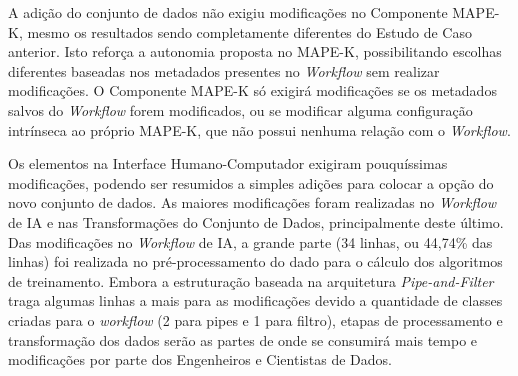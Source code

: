 \documentclass[twocolumn]{article}
\begin{document}
\begin{table}[H]
\begin{center}
  \caption{Quantidade de modificações realizadas ao adicionar um novo conjunto de dados ao \textit{Workflow}}
\label{tbl:ManutencaoPipelineDataset}
\end{center}
\end{table}

A adição do conjunto de dados não exigiu modificações no Componente MAPE-K, mesmo os resultados sendo completamente diferentes do Estudo de Caso anterior. Isto reforça a autonomia proposta no MAPE-K, possibilitando escolhas diferentes baseadas nos metadados presentes no \textit{Workflow} sem realizar modificações. O Componente MAPE-K só exigirá modificações se os metadados salvos do \textit{Workflow} forem modificados, ou se modificar alguma configuração intrínseca ao próprio MAPE-K, que não possui nenhuma relação com o \textit{Workflow}. 

Os elementos na Interface Humano-Computador exigiram pouquíssimas modificações, podendo ser resumidos a simples adições para colocar a opção do novo conjunto de dados. As maiores modificações foram realizadas no \textit{Workflow} de IA e nas Transformações do Conjunto de Dados, principalmente deste último. Das modificações no \textit{Workflow} de IA, a grande parte (34 linhas, ou 44,74\% das linhas) foi realizada no pré-processamento do dado para o cálculo dos algoritmos de treinamento. Embora a estruturação baseada na arquitetura \textit{Pipe-and-Filter} traga algumas linhas a mais para as modificações devido a quantidade de classes criadas para o \textit{workflow} (2 para pipes e 1 para filtro), etapas de processamento e transformação dos dados serão as partes de onde se consumirá mais tempo e modificações por parte dos Engenheiros e Cientistas de Dados.
\end{document}
